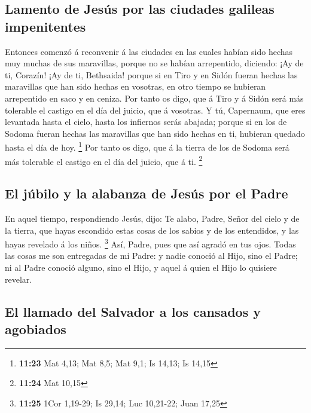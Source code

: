 \hypertarget{lamento-de-jesuxfas-por-las-ciudades-galileas-impenitentes}{%
\subsection{Lamento de Jesús por las ciudades galileas
impenitentes}\label{lamento-de-jesuxfas-por-las-ciudades-galileas-impenitentes}}

 Entonces comenzó á reconvenir á las ciudades en las
cuales habían sido hechas muy muchas de sus maravillas, porque no se
habían arrepentido, diciendo:  ¡Ay de ti, Corazín! ¡Ay de
ti, Bethsaida! porque si en Tiro y en Sidón fueran hechas las maravillas
que han sido hechas en vosotras, en otro tiempo se hubieran arrepentido
en saco y en ceniza.  Por tanto os digo, que á Tiro y á
Sidón será más tolerable el castigo en el día del juicio, que á
vosotras.  Y tú, Capernaum, que eres levantada hasta el
cielo, hasta los infiernos serás abajada; porque si en los de Sodoma
fueran hechas las maravillas que han sido hechas en ti, hubieran quedado
hasta el día de hoy. \footnote{\textbf{11:23} Mat 4,13; Mat 8,5; Mat
  9,1; Is 14,13; Is 14,15}  Por tanto os digo, que á la
tierra de los de Sodoma será más tolerable el castigo en el día del
juicio, que á ti. \footnote{\textbf{11:24} Mat 10,15}

\hypertarget{el-juxfabilo-y-la-alabanza-de-jesuxfas-por-el-padre}{%
\subsection{El júbilo y la alabanza de Jesús por el
Padre}\label{el-juxfabilo-y-la-alabanza-de-jesuxfas-por-el-padre}}

 En aquel tiempo, respondiendo Jesús, dijo: Te alabo,
Padre, Señor del cielo y de la tierra, que hayas escondido estas cosas
de los sabios y de los entendidos, y las hayas revelado á los niños.
\footnote{\textbf{11:25} 1Cor 1,19-29; Is 29,14; Luc 10,21-22; Juan
  17,25}  Así, Padre, pues que así agradó en tus ojos.
 Todas las cosas me son entregadas de mi Padre: y nadie
conoció al Hijo, sino el Padre; ni al Padre conoció alguno, sino el
Hijo, y aquel á quien el Hijo lo quisiere revelar.

\hypertarget{el-llamado-del-salvador-a-los-cansados-y-agobiados}{%
\subsection{El llamado del Salvador a los cansados
\hspace{0pt}\hspace{0pt}y
agobiados}\label{el-llamado-del-salvador-a-los-cansados-y-agobiados}}

